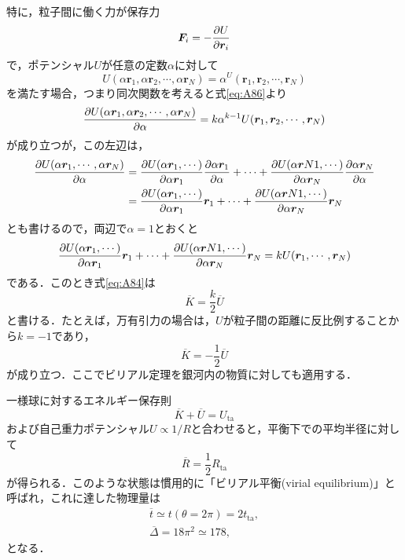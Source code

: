 特に，粒子間に働く力が保存力
\begin{equation}
	\bm{F}_i = - \pdv{U}{\bm{r}_i}
\end{equation}
で，ポテンシャル$U$が任意の定数$\alpha$に対して
\begin{equation}
	U(\alpha \bm{r}_1,\alpha \bm{r}_2,\cdots,\alpha \bm{r}_N) = \alpha^ U(\bm{r}_1, \bm{r}_2,\cdots,\bm{r}_N) \label{eq:A86}
\end{equation}
を満たす場合，つまり同次関数を考えると式\eqref{eq:A86}より
\begin{equation}
	\pdv{U(\alpha \bm{r}_1,\alpha \bm{r}_2,\cdots,\alpha \bm{r}_N)}{\alpha} = k \alpha^{k-1} U(\bm{r}_1, \bm{r}_2,\cdots,\bm{r}_N)
\end{equation}
が成り立つが，この左辺は，
\begin{align}
	\pdv{U(\alpha \bm{r}_1,\cdots,\alpha \bm{r}_N)}{\alpha} 
	&= \pdv{U(\alpha \bm{r}_1,\cdots)}{\alpha \bm{r}_1} \pdv{\alpha \bm{r}_1}{\alpha} +
	\cdots +
	\pdv{U(\alpha \bm{r}N1,\cdots)}{\alpha \bm{r}_N} \pdv{\alpha \bm{r}_N}{\alpha} \\
	&= \pdv{U(\alpha \bm{r}_1,\cdots)}{\alpha \bm{r}_1} \bm{r}_1 +
	\cdots +
	\pdv{U(\alpha \bm{r}N1,\cdots)}{\alpha \bm{r}_N}\bm{r}_N
\end{align}
とも書けるので，両辺で$\alpha = 1$とおくと
\begin{equation}
	\pdv{U(\alpha \bm{r}_1,\cdots)}{\alpha \bm{r}_1} \bm{r}_1 +
	\cdots +
	\pdv{U(\alpha \bm{r}N1,\cdots)}{\alpha \bm{r}_N}\bm{r}_N
	= kU(\bm{r}_1, \cdots, \bm{r}_N)
\end{equation}
である．このとき式\eqref{eq:A84}は
\begin{equation}
	\overline{K} = \frac{k}{2} \overline{U}
\end{equation}
と書ける．たとえば，万有引力の場合は，$U$が粒子間の距離に反比例することから$k = -1$であり，
\begin{equation}
	\overline{K} = - \frac{1}{2} \overline{U}
\end{equation}
が成り立つ．ここでビリアル定理を銀河内の物質に対しても適用する．

一様球に対するエネルギー保存則
\begin{equation}
	\overline{K} + \overline{U} = U_\text{ta}
\end{equation}
および自己重力ポテンシャル$U \propto 1/R$と合わせると，平衡下での平均半径に対して
\begin{equation}
	\overline{R} = \frac{1}{2}R_\text{ta}
\end{equation}
が得られる．このような状態は慣用的に「ビリアル平衡(virial equilibrium)」と呼ばれ，これに達した物理量は
\begin{align}
	\overline{t} \simeq t(\theta = 2\pi) = 2t_\text{ta},\\
	\overline{\Delta} = 18 \pi^2 \simeq 178,
\end{align}
となる．

